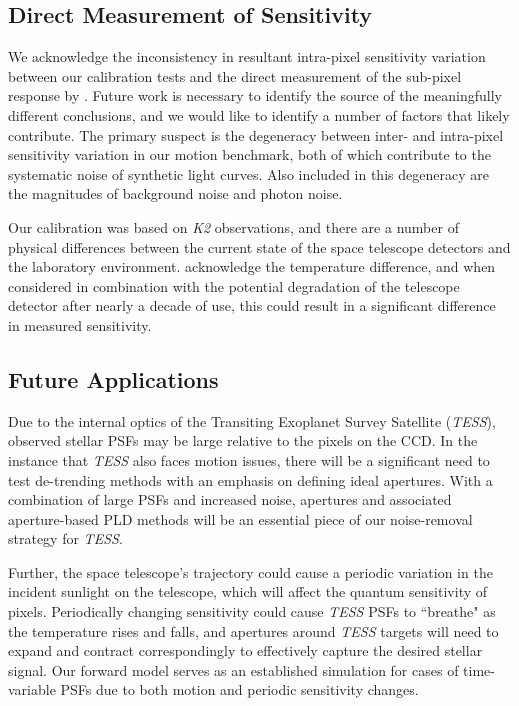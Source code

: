 \documentclass[12pt,preprint]{aastex}
\begin{document}
\subsection{Direct Measurement of Sensitivity}

We acknowledge the inconsistency in resultant intra-pixel sensitivity variation between our calibration tests and the direct measurement of the sub-pixel response by \cite{2018arXiv180607430V}. Future work is necessary to identify the source of the meaningfully different conclusions, and we would like to identify a number of factors that likely contribute. The primary suspect is the degeneracy between inter- and intra-pixel sensitivity variation in our motion benchmark, both of which contribute to the systematic noise of synthetic light curves. Also included in this degeneracy are the magnitudes of background noise and photon noise.

Our calibration was based on \textit{K2} observations, and there are a number of physical differences between the current state of the space telescope detectors and the laboratory environment. \cite{2018arXiv180607430V} acknowledge the temperature difference, and when considered in combination with the potential degradation of the telescope detector after nearly a decade of use, this could result in a significant difference in measured sensitivity.

\subsection{Future Applications}

Due to the internal optics of the Transiting Exoplanet Survey Satellite (\textit{TESS}), observed stellar PSFs may be large relative to the pixels on the CCD. In the instance that \textit{TESS} also faces motion issues, there will be a significant need to test de-trending methods with an emphasis on defining ideal apertures. With a combination of large PSFs and increased noise, apertures and associated aperture-based PLD methods will be an essential piece of our noise-removal strategy for \textit{TESS}.

Further, the space telescope's trajectory could cause a periodic variation in the incident sunlight on the telescope, which will affect the quantum sensitivity of pixels. Periodically changing sensitivity could cause \textit{TESS} PSFs to ``breathe" as the temperature rises and falls, and apertures around \textit{TESS} targets will need to expand and contract correspondingly to effectively capture the desired stellar signal. Our forward model serves as an established simulation for cases of time-variable PSFs due to both motion and periodic sensitivity changes.
\end{document}
